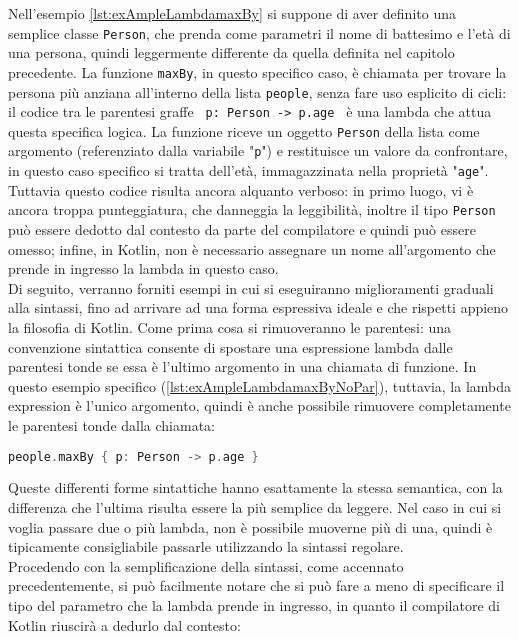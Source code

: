 Nell'esempio \ref{lst:exAmpleLambdamaxBy} si suppone di aver definito una semplice classe \texttt{Person}, che prenda come parametri il nome di battesimo e l'età di una persona, quindi leggermente differente da quella definita nel capitolo precedente. La funzione \texttt{maxBy}, in questo specifico caso, è chiamata per trovare la persona più anziana all’interno della lista \texttt{people}, senza fare uso esplicito di cicli: il codice tra le parentesi graffe \texttt{{ p: Person -> p.age }} è una lambda che attua questa specifica logica. La funzione riceve un oggetto \texttt{Person} della lista come argomento (referenziato dalla variabile "\texttt{p}") e restituisce un valore da confrontare, in questo caso specifico si tratta dell'età, immagazzinata nella proprietà "\texttt{age}". Tuttavia questo codice risulta ancora alquanto verboso: in primo luogo, vi è ancora troppa punteggiatura, che danneggia la leggibilità, inoltre il tipo \texttt{Person} può essere dedotto dal contesto da parte del compilatore e quindi può essere omesso; infine, in Kotlin, non è necessario assegnare un nome all'argomento che prende in ingresso la lambda in questo caso.\\
Di seguito, verranno forniti esempi in cui si eseguiranno miglioramenti graduali alla sintassi, fino ad arrivare ad una forma espressiva ideale e che rispetti appieno la filosofia di Kotlin. Come prima cosa si rimuoveranno le parentesi: una convenzione sintattica consente di spostare una espressione lambda dalle parentesi tonde se essa è l'ultimo argomento in una chiamata di funzione. In questo esempio specifico (\ref{lst:exAmpleLambdamaxByNoPar}), tuttavia, la lambda expression è l'unico argomento, quindi è anche possibile rimuovere completamente le parentesi tonde dalla chiamata:\\

\begin{lstlisting}[caption={Rimozione delle parentesi tonde}, captionpos=b, label={lst:exAmpleLambdamaxByNoPar}, language=Kotlin]
people.maxBy { p: Person -> p.age }
\end{lstlisting}

Queste differenti forme sintattiche hanno esattamente la stessa semantica, con la differenza che l'ultima risulta essere la più semplice da leggere. Nel caso in cui si voglia passare due o più lambda, non è possibile muoverne più di una, quindi è tipicamente consigliabile passarle utilizzando la sintassi regolare.\\
Procedendo con la semplificazione della sintassi, come accennato precedentemente, si può facilmente notare che si può fare a meno di specificare il tipo del parametro che la lambda prende in ingresso, in quanto il compilatore di Kotlin riuscirà a dedurlo dal contesto:\\

